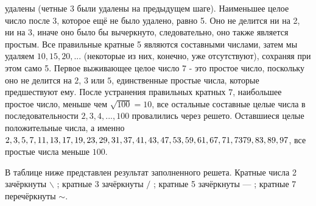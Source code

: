 \documentclass[11pt]{article}
\begin{document}
	\thispagestyle{fancy}
	\lhead{\thepage}

удалены (четные 3 были удалены на предыдущем шаге). Наименьшее целое число после 3, которое ещё не было удалено, равно 5. Оно не делится ни на 2, ни на 3, иначе оно было бы вычеркнуто, следовательно, оно также является простым. Все правильные кратные 5 являются составными числами, затем мы удаляем $10, 15, 20, ...$ (некоторые из них, конечно, уже отсутствуют), сохраняя при этом само 5. Первое выживающее целое число $7$ - это простое число, поскольку оно не делится на $2$, $3$ или $5$, единственные простые числа, которые предшествуют ему. После устранения правильных кратных $7$, наибольшее простое число, меньше чем $\sqrt {100}= 10$, все остальные составные целые числа в последовательности $2, 3, 4, ..., 100$ провалились через решето. Оставшиеся целые положительные числа, а именно $2, 3, 5, 7, 11, 13, 17, 19, 23, 29, 31, 37, 41, 43,\\ 47, 53, 59, 61, 67, 71, 73 79, 83, 89, 97$, все простые числа меньше $100$.
\setlength{\parindent}{5ex}

В таблице ниже представлен результат заполненного решета. Кратные числа 2 зачёркнуты $\backslash$ ; кратные 3 зачёркнуты $\slash$ ; кратные 5 зачёркнуты — ; кратные 7 перечёркнуты $\sim$.
\end{document}
